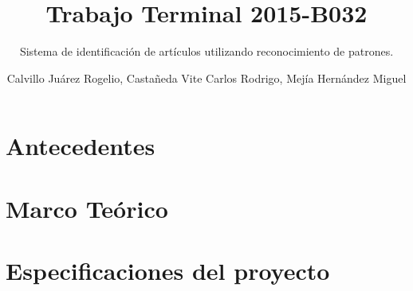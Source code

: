 \documentclass[oneside,10pt]{book}
\title{Trabajo Terminal 2015-B032}
\subtitle{Sistema de identificaci\'on de art\'iculos utilizando reconocimiento de patrones.}
\author{Calvillo Ju\'arez Rogelio, Casta\~neda Vite Carlos Rodrigo, Mej\'ia Hern\'andez Miguel}
\begin{document}
\sloppy 







\thispagestyle{empty}

\frontmatter
\tableofcontents
\frontmatter
\listoffigures %
\frontmatter
\listoftables %

\mainmatter

\chapter{Antecedentes}





\chapter{Marco Te\'orico}




%
%
%
%




%



\chapter{Especificaciones del proyecto}




\end{document}

